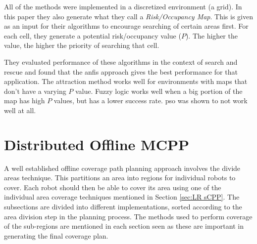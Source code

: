 All of the methods were implemented in a discretized environment (a grid). In this paper they also generate what they call a \emph{Risk/Occupancy Map}. This is given as an input for their algorithms to encourage searching of certain areas first. For each cell, they generate a potential risk/occupancy value ($P$). The higher the value, the higher the priority of searching that cell.

They evaluated performance of these algorithms in the context of search and rescue and found that the \ac{anfis} approach gives the best performance for that application. The attraction method works well for environments with maps that don't have a varying $P$ value. Fuzzy logic works well when a big portion of the map has high $P$ values, but has a lower success rate. \ac{pso} was shown to not work well at all.


\section{Distributed Offline MCPP}
\label{sec:LR Ditributed MCPP}
A well established offline coverage path planning approach involves the divide areas technique. This partitions an area into regions for individual robots to cover. Each robot should then be able to cover its area using one of the individual area coverage techniques mentioned in Section \ref{sec:LR sCPP}. The subsections are divided into different implementations, sorted according to the area division step in the planning process. The methods used to perform coverage of the sub-regions are mentioned in each section seen as these are important in generating the final coverage plan.
